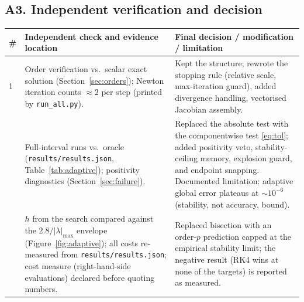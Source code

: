 ﻿\documentclass[11pt,a4paper]{article}
\begin{document}
\subsection*{A3. Independent verification and decision}
\begin{center}
\begin{tabular}{@{}p{0.4cm}p{7.2cm}p{6.4cm}@{}}
\toprule
\# & Independent check and evidence location & Final decision / modification / limitation \\
\midrule
1 &
Order verification vs.\ scalar exact solution (Section~\ref{sec:orders});
Newton iteration counts $\approx2$ per step (printed by \texttt{run\_all.py}). &
Kept the structure; rewrote the stopping rule (relative scale,
max-iteration guard), added divergence handling, vectorised Jacobian
assembly. \\
\addlinespace
2 &
Full-interval runs vs.\ oracle (\texttt{results/results.json},
Table~\ref{tab:adaptive}); positivity diagnostics
(Section~\ref{sec:failure}). &
Replaced the absolute test with the componentwise test \eqref{eq:tol};
added positivity veto, stability-ceiling memory, explosion guard, and
endpoint snapping.  Documented limitation: adaptive global error
plateaus at $\sim10^{-6}$ (stability, not accuracy, bound). \\
\addlinespace
3 &
$h$ from the search compared against the $2.8/|\lambda|_{\max}$
envelope (Figure~\ref{fig:adaptive}); all costs re-measured from
\texttt{results/results.json}; cost measure (right-hand-side evaluations)
declared before quoting numbers. &
Replaced bisection with an order-$p$ prediction capped at the empirical
stability limit; the negative result (RK4 wins at none of the targets)
is reported as measured. \\
\bottomrule
\end{tabular}
\end{center}
\end{document}
